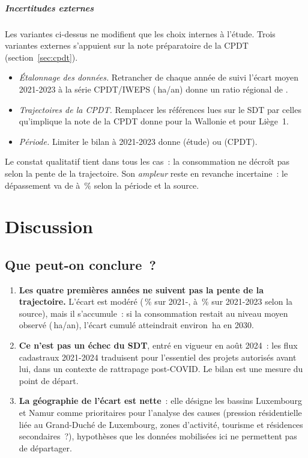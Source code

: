 \documentclass[11pt,a4paper]{report}
\newcommand{\ha}{\,ha}
\newcommand{\haan}{\,ha/an}
\begin{document}
\paragraph{Incertitudes externes} Les variantes ci-dessus ne modifient que les choix internes à l'étude. Trois variantes externes s'appuient sur la note préparatoire de la CPDT (section~\ref{sec:cpdt}).
\begin{itemize}
\item \emph{Étalonnage des données.} Retrancher de chaque année de suivi l'écart moyen 2021-2023 à la série CPDT/IWEPS (\CpdtEcartWal\haan) donne un ratio régional de \WalRatioCal.
\item \emph{Trajectoires de la CPDT.} Remplacer les références lues sur le SDT par celles qu'implique la note de la CPDT donne \WalRatioRefCpdt{} pour la Wallonie et \LUnRatioRefCpdt{} pour Liège~1.
\item \emph{Période.} Limiter le bilan à 2021-2023 donne \EtudeRatioTroisWal{} (étude) ou \CpdtRatioWal{} (CPDT).
\end{itemize}
Le constat qualitatif tient dans tous les cas~: la consommation ne décroît pas selon la pente de la trajectoire. Son \emph{ampleur} reste en revanche incertaine~: le dépassement va de \CpdtDepassPct{} à \WalDepassPct\,\% selon la période et la source.

\chapter{Discussion}
\label{ch:discussion}

\section{Que peut-on conclure~?}
\begin{enumerate}
\item \textbf{Les quatre premières années ne suivent pas la pente de la trajectoire.} L'écart est modéré (\WalDepassPct\,\% sur 2021-\AnneeFinObs, \CpdtDepassPct{} à \EtudeDepassTroisPct\,\% sur 2021-2023 selon la source), mais il s'accumule~: si la consommation restait au niveau moyen observé (\WalObsMoy\haan), l'écart cumulé atteindrait environ \WalEcartProj\ha{} en 2030.
\item \textbf{Ce n'est pas un échec du SDT}, entré en vigueur en août 2024~: les flux cadastraux 2021-2024 traduisent pour l'essentiel des projets autorisés avant lui, dans un contexte de rattrapage post-COVID. Le bilan est une mesure du point de départ.
\item \textbf{La géographie de l'écart est nette}~: elle désigne les bassins Luxembourg et Namur comme prioritaires pour l'analyse des causes (pression résidentielle liée au Grand-Duché de Luxembourg, zones d'activité, tourisme et résidences secondaires~?), hypothèses que les données mobilisées ici ne permettent pas de départager.
\end{enumerate}
\end{document}
